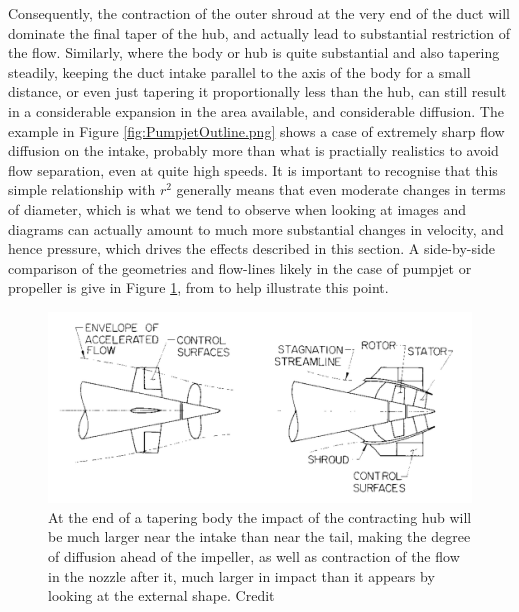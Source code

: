 \documentclass{article}\usepackage[]{graphicx}\usepackage[]{color}
\begin{document}
Consequently, the contraction of the outer shroud at the very end of the duct will dominate the final taper of the hub, and actually lead to substantial restriction of the flow.  Similarly, where the body or hub is quite substantial and also tapering steadily, keeping the duct intake parallel to the axis of the body for a small distance, or even just tapering it proportionally less than the hub, can still result in a considerable expansion in the area available, and considerable diffusion.  The example in Figure \ref{fig:PumpjetOutline.png} shows a case of extremely sharp flow diffusion on the intake, probably more than what is practially realistics to avoid flow separation, even at quite high speeds. It is important to recognise that this simple relationship with $r^2$ generally means that even moderate changes in terms of diameter, which is what we tend to observe when looking at images and diagrams can actually amount to much more substantial changes in velocity, and hence pressure, which drives the effects described in this section.  A side-by-side comparison of the geometries and flow-lines likely in the case of pumpjet or propeller is give in Figure \ref{fig:Comparison.png}, from  to help illustrate this point.

\begin{figure}
\includegraphics[width=\textwidth]{Comparison.png}
\caption{At the end of a tapering body the impact of the contracting hub will be much larger near the intake than near the tail, making the degree of diffusion ahead of the impeller, as well as contraction of the flow in the nozzle after it, much larger in impact than it appears by looking at the external shape. Credit \cite{gearhart1966selection}}
\label{fig:Comparison.png}
\end{figure}
\end{document}
